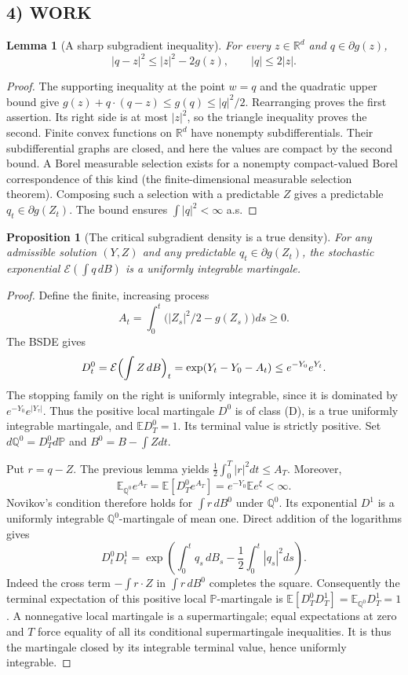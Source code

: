 \documentclass[11pt,a4paper]{article}
\newcommand{\R}{\mathbb R}
\newcommand{\E}{\mathbb E}
\newcommand{\Pp}{\mathbb P}
\newcommand{\Q}{\mathbb Q}
\newcommand{\cE}{\mathcal E}
\newtheorem{lemma}[theorem]{Lemma}
\newtheorem{proposition}[theorem]{Proposition}
\theoremstyle{definition}
\begin{document}
\subsection*{4) WORK}
\begin{lemma}[A sharp subgradient inequality]
For every $z\in\R^d$ and $q\in\partial g(z)$,
\[
 |q-z|^2\le |z|^2-2g(z),\qquad |q|\le2|z|.
\]
\end{lemma}
\begin{proof}
The supporting inequality at the point $w=q$ and the quadratic upper bound give
$g(z)+q\cdot(q-z)\le g(q)\le|q|^2/2$.
Rearranging proves the first assertion. Its right side is at most $|z|^2$, so the triangle inequality proves the second. Finite convex functions on $\R^d$ have nonempty subdifferentials. Their subdifferential graphs are closed, and here the values are compact by the second bound. A Borel measurable selection exists for a nonempty compact-valued Borel correspondence of this kind (the finite-dimensional measurable selection theorem). Composing such a selection with a predictable $Z$ gives a predictable $q_t\in\partial g(Z_t)$. The bound ensures $\int|q|^2<\infty$ a.s.
\end{proof}

\begin{proposition}[The critical subgradient density is a true density]
For any admissible solution $(Y,Z)$ and any predictable $q_t\in\partial g(Z_t)$, the stochastic exponential $\cE(\int q\,dB)$ is a uniformly integrable martingale.
\end{proposition}
\begin{proof}
Define the finite, increasing process
\[
 A_t=\int_0^t\bigl(|Z_s|^2/2-g(Z_s)\bigr)ds\ge0.
\]
The BSDE gives
\[
 D^0_t=\cE\Bigl(\int Z\,dB\Bigr)_t
       =\exp(Y_t-Y_0-A_t)\le e^{-Y_0}e^{Y_t}.
\]
The stopping family on the right is uniformly integrable, since it is dominated by $e^{-Y_0}e^{|Y_\tau|}$. Thus the positive local martingale $D^0$ is of class (D), is a true uniformly integrable martingale, and $\E D^0_T=1$. Its terminal value is strictly positive. Set $d\Q^0=D^0_Td\Pp$ and $B^0=B-\int Zdt$.

Put $r=q-Z$. The previous lemma yields $\frac12\int_0^T|r|^2dt\le A_T$. Moreover,
\[
 \E_{\Q^0}e^{A_T}
 =\E[D^0_Te^{A_T}]
 =e^{-Y_0}\E e^\xi<\infty.
\]
Novikov's condition therefore holds for $\int r\,dB^0$ under $\Q^0$. Its exponential $D^1$ is a uniformly integrable $\Q^0$-martingale of mean one. Direct addition of the logarithms gives
\[
 D^0_tD^1_t
 =\exp\left(\int_0^tq_s\,dB_s-\frac12\int_0^t|q_s|^2ds\right).
\]
Indeed the cross term $-\int r\cdot Z$ in $\int r\,dB^0$ completes the square. Consequently the terminal expectation of this positive local $\Pp$-martingale is
$\E[D^0_TD^1_T]=\E_{\Q^0}D^1_T=1$. A nonnegative local martingale is a supermartingale; equal expectations at zero and $T$ force equality of all its conditional supermartingale inequalities. It is thus the martingale closed by its integrable terminal value, hence uniformly integrable.
\end{proof}
\end{document}
